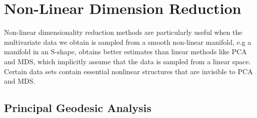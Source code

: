 \documentclass[12pt]{report}
\begin{document}
\section{Non-Linear Dimension Reduction}

Non-linear dimensionality reduction methods are particularly useful 
when the multivariate data we obtain is sampled from a smooth non-linear manifold, 
e.g a manifold in an S-shape, obtains better estimates than linear methods like PCA and MDS, 
which implicitly assume that the data is sampled from a linear space. 
Certain data sets contain essential nonlinear structures that are invisible to PCA and MDS.

\newpage

\subsection{Principal Geodesic Analysis}
\end{document}

